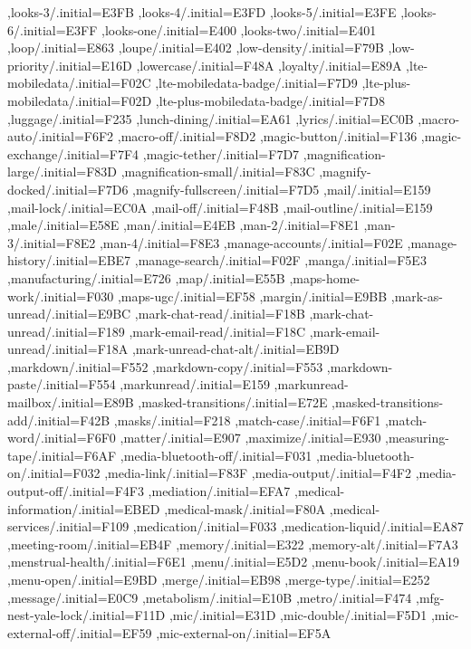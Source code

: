 { ,looks-3/.initial=E3FB
 ,looks-4/.initial=E3FD
 ,looks-5/.initial=E3FE
 ,looks-6/.initial=E3FF
 ,looks-one/.initial=E400
 ,looks-two/.initial=E401
 ,loop/.initial=E863
 ,loupe/.initial=E402
 ,low-density/.initial=F79B
 ,low-priority/.initial=E16D
 ,lowercase/.initial=F48A
 ,loyalty/.initial=E89A
 ,lte-mobiledata/.initial=F02C
 ,lte-mobiledata-badge/.initial=F7D9
 ,lte-plus-mobiledata/.initial=F02D
 ,lte-plus-mobiledata-badge/.initial=F7D8
 ,luggage/.initial=F235
 ,lunch-dining/.initial=EA61
 ,lyrics/.initial=EC0B
 ,macro-auto/.initial=F6F2
 ,macro-off/.initial=F8D2
 ,magic-button/.initial=F136
 ,magic-exchange/.initial=F7F4
 ,magic-tether/.initial=F7D7
 ,magnification-large/.initial=F83D
 ,magnification-small/.initial=F83C
 ,magnify-docked/.initial=F7D6
 ,magnify-fullscreen/.initial=F7D5
 ,mail/.initial=E159
 ,mail-lock/.initial=EC0A
 ,mail-off/.initial=F48B
 ,mail-outline/.initial=E159
 ,male/.initial=E58E
 ,man/.initial=E4EB
 ,man-2/.initial=F8E1
 ,man-3/.initial=F8E2
 ,man-4/.initial=F8E3
 ,manage-accounts/.initial=F02E
 ,manage-history/.initial=EBE7
 ,manage-search/.initial=F02F
 ,manga/.initial=F5E3
 ,manufacturing/.initial=E726
 ,map/.initial=E55B
 ,maps-home-work/.initial=F030
 ,maps-ugc/.initial=EF58
 ,margin/.initial=E9BB
 ,mark-as-unread/.initial=E9BC
 ,mark-chat-read/.initial=F18B
 ,mark-chat-unread/.initial=F189
 ,mark-email-read/.initial=F18C
 ,mark-email-unread/.initial=F18A
 ,mark-unread-chat-alt/.initial=EB9D
 ,markdown/.initial=F552
 ,markdown-copy/.initial=F553
 ,markdown-paste/.initial=F554
 ,markunread/.initial=E159
 ,markunread-mailbox/.initial=E89B
 ,masked-transitions/.initial=E72E
 ,masked-transitions-add/.initial=F42B
 ,masks/.initial=F218
 ,match-case/.initial=F6F1
 ,match-word/.initial=F6F0
 ,matter/.initial=E907
 ,maximize/.initial=E930
 ,measuring-tape/.initial=F6AF
 ,media-bluetooth-off/.initial=F031
 ,media-bluetooth-on/.initial=F032
 ,media-link/.initial=F83F
 ,media-output/.initial=F4F2
 ,media-output-off/.initial=F4F3
 ,mediation/.initial=EFA7
 ,medical-information/.initial=EBED
 ,medical-mask/.initial=F80A
 ,medical-services/.initial=F109
 ,medication/.initial=F033
 ,medication-liquid/.initial=EA87
 ,meeting-room/.initial=EB4F
 ,memory/.initial=E322
 ,memory-alt/.initial=F7A3
 ,menstrual-health/.initial=F6E1
 ,menu/.initial=E5D2
 ,menu-book/.initial=EA19
 ,menu-open/.initial=E9BD
 ,merge/.initial=EB98
 ,merge-type/.initial=E252
 ,message/.initial=E0C9
 ,metabolism/.initial=E10B
 ,metro/.initial=F474
 ,mfg-nest-yale-lock/.initial=F11D
 ,mic/.initial=E31D
 ,mic-double/.initial=F5D1
 ,mic-external-off/.initial=EF59
 ,mic-external-on/.initial=EF5A
}
